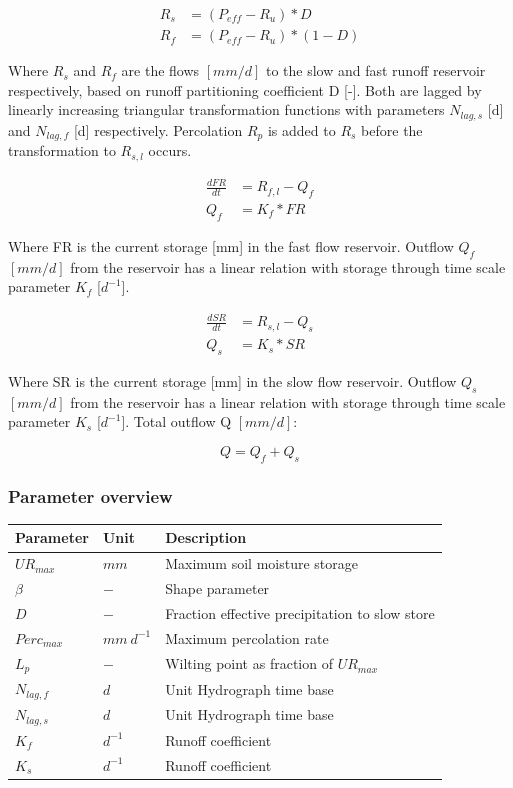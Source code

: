 \begin{align}
	R_s &= (P_{eff} - R_u)*D\\
	R_f &= (P_{eff} - R_u)*(1-D)
\end{align}

Where $R_s$ and $R_f$ are the flows $[mm/d]$ to the slow and fast runoff reservoir respectively, based on runoff partitioning coefficient D [-]. Both are lagged by linearly increasing triangular transformation functions with parameters $N_{lag,s}$ [d] and $N_{lag,f}$ [d] respectively. Percolation $R_p$ is added to $R_s$ before the transformation to $R_{s,l}$ occurs.

\begin{align}
	\frac{dFR}{dt} &= R_{f,l} - Q_f\\
	Q_f &= K_f * FR 
\end{align}

Where FR is the current storage [mm] in the fast flow reservoir. Outflow $Q_f$ $[mm/d]$ from the reservoir has a linear relation with storage through time scale parameter $K_f$ [$d^{-1}$]. 

\begin{align}
	\frac{dSR}{dt} &= R_{s,l} - Q_s \\
	Q_s &= K_s * SR 
\end{align}

Where SR is the current storage [mm] in the slow flow reservoir. Outflow $Q_s$ $[mm/d]$ from the reservoir has a linear relation with storage through time scale parameter $K_s$ [$d^{-1}$]. Total outflow Q  $[mm/d]$:

\begin{equation}
	Q = Q_f + Q_s
\end{equation}

\subsubsection{Parameter overview}
\begin{table}[htbp]
  \centering
    \begin{tabular}{lll}
    \toprule
    Parameter & Unit  & Description \\
    \midrule
    $UR_{max}$ & $mm$  & Maximum soil moisture storage \\
    $\beta$ & $-$   & Shape parameter \\
    $D$   & $-$   & Fraction effective precipitation to slow store \\
    $Perc_{max}$ & $mm~d^{-1}$ & Maximum percolation rate \\
    $L_p$ & $-$   & Wilting point as fraction of $UR_{max}$ \\
    $N_{lag,f}$ & $d$   & Unit Hydrograph time base \\
    $N_{lag,s}$ & $d$   & Unit Hydrograph time base \\
    $K_f$ & $d^{-1}$ & Runoff coefficient \\
    $K_s$ & $d^{-1}$ & Runoff coefficient \\
    \bottomrule
    \end{tabular}%
  \label{tab:addlabel}%
\end{table}%
